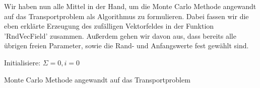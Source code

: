 Wir haben nun alle Mittel in der Hand, um die Monte Carlo Methode angewandt auf das Transportproblem als Algorithmus zu formulieren. Dabei fassen wir die eben erklärte Erzeugung des zufälligen Vektorfeldes in der Funktion 'RndVecField' zusammen.
Außerdem gehen wir davon aus, dass bereits alle übrigen freien Parameter, sowie die Rand- und Anfangswerte fest gewählt sind.
\begin{algorithm}[H]
	\DontPrintSemicolon
	\SetAlgoLined
	\BlankLine
	Initialisiere: $ \Sigma =0, i=0 $\;
	\BlankLine
	\caption{Monte Carlo Methode angewandt auf das Transportproblem}
\end{algorithm}\bigskip %

